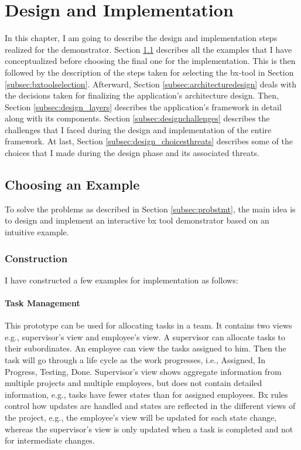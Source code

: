 \section{Design and Implementation}\label{sec:design}
In this chapter, I am going to describe the design and implementation steps realized for the demonstrator. Section \ref{subsec:exampleforimplementation} describes all the examples that I have conceptualized before choosing the final one for the implementation. This is then followed by the description of the steps taken for selecting the bx-tool in Section \ref{subsec:bxtoolselection}. Afterward, Section \ref{subsec:architecturedesign} deals with the decisions taken for finalizing the application's architecture design. Then, Section \ref{subsec:design_layers} describes the application's framework in detail along with its components. Section \ref{subsec:designchallenges} describes the challenges that I faced during the design and implementation of the entire framework. At last, Section \ref{subsec:design_choicesthreats} describes some of the choices that I made during the design phase and its associated threats. 

\subsection{Choosing an Example}\label{subsec:exampleforimplementation}
To solve the problems as described in Section \ref{subsec:probstmt}, the main idea is to design and implement an interactive bx tool demonstrator based on an intuitive example.

\subsubsection{Construction}\label{subsubsec:exampleconstruction}
I have constructed a few examples for implementation as follows:

\paragraph{Task Management} This prototype can be used for allocating tasks in a team. It contains two views e.g., supervisor's view and employee's view. A supervisor can allocate tasks to their subordinates. An employee can view the tasks assigned to him. Then the task will go through a life cycle as the work progresses, i.e., Assigned, In Progress, Testing, Done. Supervisor's view shows aggregate information from multiple projects and multiple employees, but does not contain detailed information, e.g., tasks have fewer states than for assigned employees. Bx rules control how updates are handled and states are reflected in the different views of the project, e.g., the employee's view will be updated for each state change, whereas the supervisor's view is only updated when a task is completed and not for intermediate changes.

